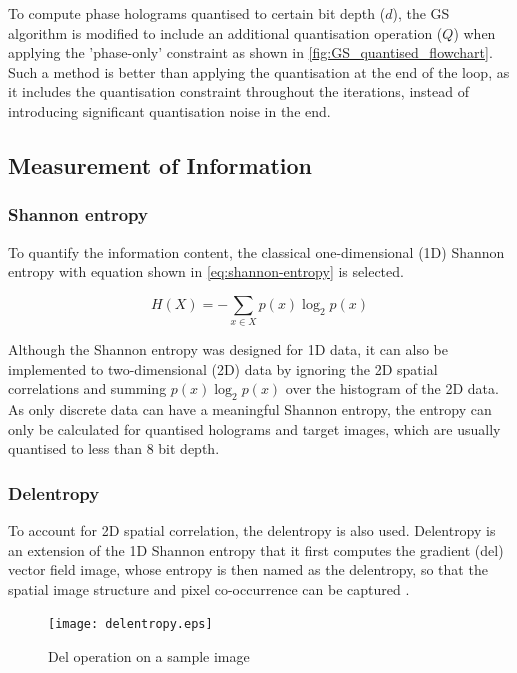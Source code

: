 	To compute phase holograms quantised to certain bit depth ($d$), the GS algorithm is modified to include an additional quantisation operation ($Q$) when applying the 'phase-only' constraint as shown in \cref{fig:GS_quantised_flowchart}. Such a method is better than applying the quantisation at the end of the loop, as it includes the quantisation constraint throughout the iterations, instead of introducing significant quantisation noise in the end.



\subsection{Measurement of Information}
\subsubsection{Shannon entropy}
	To quantify the information content, the classical one-dimensional (1D) Shannon entropy \cite{Shannon1948} with equation shown in \cref{eq:shannon-entropy} is selected.

	\begin{equation}
		H(X) = -\sum_{x\in X} p(x)\log_2p(x)
		\label{eq:shannon-entropy}
	\end{equation}

	Although the Shannon entropy was designed for 1D data, it can also be implemented to two-dimensional (2D) data by ignoring the 2D spatial correlations and summing $p(x)\log_2p(x)$ over the histogram of the 2D data. As only discrete data can have a meaningful Shannon entropy, the entropy can only be calculated for quantised holograms and target images, which are usually quantised to less than 8 bit depth.


\subsubsection{Delentropy} \label{sec:Delentropy}
	To account for 2D spatial correlation, the delentropy \cite{Larkin2016} is also used. Delentropy is an extension of the 1D Shannon entropy that it first computes the gradient (del) vector field image, whose entropy is then named as the delentropy, so that the spatial image structure and pixel co-occurrence can be captured \cite{Larkin2016}.

	\begin{figure} [H]
	   \begin{center}
	   \texttt{[image: delentropy.eps]}
	   \end{center}
	   \caption{\label{fig:delentropy} Del operation on a sample image}
	\end{figure}

